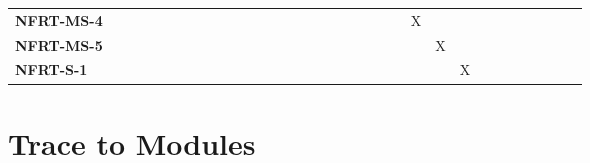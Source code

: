 \documentclass[12pt, titlepage]{article}
\begin{document}
\begin{landscape}
\begin{table}[H]
\begin{adjustbox}{width=\paperwidth}
\begin{tabular}{l|cccccccccccccccccccccc}
        \textbf{NFRT-MS-4}  & ~ & ~ & ~ & ~ & ~ & ~ & ~ & ~ & ~ & ~ & ~ & ~ & ~ & ~ & X & ~ & ~ & ~ & ~ & ~ & ~ & ~\\
        \textbf{NFRT-MS-5}  & ~ & ~ & ~ & ~ & ~ & ~ & ~ & ~ & ~ & ~ & ~ & ~ & ~ & ~ & ~ & X & ~ & ~ & ~ & ~ & ~ & ~\\
        \textbf{NFRT-S-1}   & ~ & ~ & ~ & ~ & ~ & ~ & ~ & ~ & ~ & ~ & ~ & ~ & ~ & ~ & ~ & ~ & X & ~ & ~ & ~ & ~ & ~\\
    \end{tabular}
    \end{adjustbox}
    \label{Traceability Matrix: Non-Functional Requirement}
\end{table}
\end{landscape}

\section{Trace to Modules}      
\end{document}

